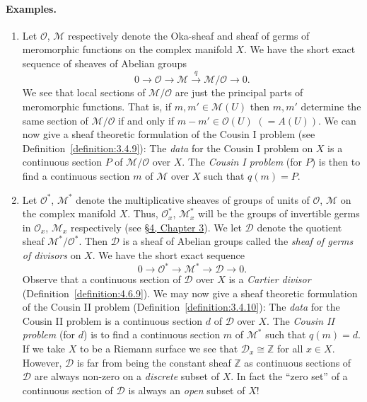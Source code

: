 \paragraph{Examples.}
\begin{enumerate}[start=24]
\item Let $\mathcal O$, $\mathcal M$ respectively denote the Oka-sheaf and sheaf of germs of meromorphic functions on the complex manifold $X$. We have the short exact sequence of sheaves of Abelian groups
\[
0\to\mathcal O\to\mathcal M\xrightarrow{q}\mathcal M/\mathcal O\to0.
\]
We see that local sections of $\mathcal M/\mathcal O$ are just the principal parts of meromorphic functions. That is, if $m,m'\in\mathcal M(U)$ then $m,m'$ determine the same section of $\mathcal M/\mathcal O$ if and only if $m-m'\in\mathcal O(U)$ $(=A(U))$. We can now give a sheaf theoretic formulation of the Cousin I problem (see Definition~\ref{definition:3.4.9}): The \emph{data} for the Cousin I problem on $X$ is a continuous section $P$ of $\mathcal M/\mathcal O$ over $X$. The \emph{Cousin I problem} (for $P$) is then to find a continuous section $m$ of $\mathcal M$ over $X$ such that $q(m)=P$.
\item Let $\mathcal O^*$, $\mathcal M^*$ denote the multiplicative sheaves of groups of units of $\mathcal O$, $\mathcal M$ on the complex manifold $X$. Thus, $\mathcal O_x^*$, $\mathcal M_x^*$ will be the groups of invertible germs in $\mathcal O_x$, $\mathcal M_x$ respectively (see \hyperref[sec:3:4]{\S4, Chapter 3}). We let $\mathcal D$ denote the quotient sheaf $\mathcal M^*/\mathcal O^*$. Then $\mathcal D$ is a sheaf of Abelian groups called the \emph{sheaf of germs of divisors} on $X$. We have the short exact sequence
\[
0\to\mathcal O^*\to\mathcal M^*\to\mathcal D\to0.
\]
Observe that a continuous section of $\mathcal D$ over $X$ is a \emph{Cartier divisor} (Definition~\ref{definition:4.6.9}). We may now give a sheaf theoretic formulation of the Cousin II problem (Definition~\ref{definition:3.4.10}): The \emph{data} for the Cousin II problem is a continuous section $d$ of $\mathcal D$ over $X$. The \emph{Cousin II problem} (for $d$) is to find a continuous section $m$ of $\mathcal M^*$ such that $q(m)=d$.
If we take $X$ to be a Riemann surface we see that $\mathcal D_x\cong\mathbb Z$ for all $x\in X$. However, $\mathcal D$ is far from being the constant sheaf $\mathbb Z$ as continuous sections of $\mathcal D$ are always non-zero on a \emph{discrete} subset of $X$. In fact the ``zero set'' of a continuous section of $\mathcal D$ is always an \emph{open} subset of $X$!

\end{enumerate}

